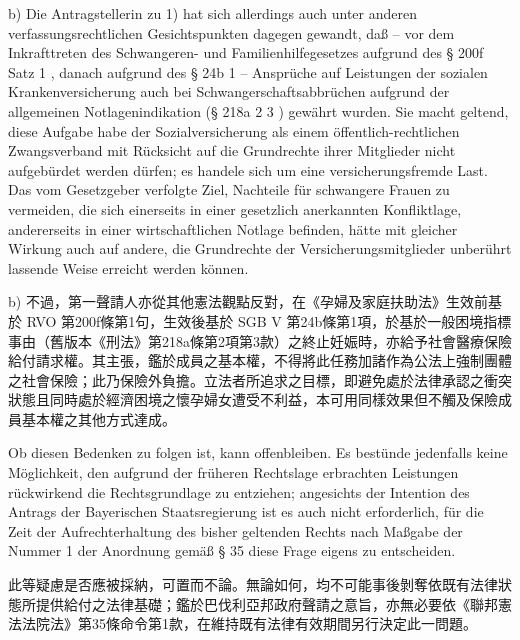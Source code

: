 \documentclass[12pt]{article}
\begin{document}
\begin{sourcepara}[title={原文E.233}]
b) Die Antragstellerin zu 1) hat sich allerdings auch unter anderen verfassungsrechtlichen Gesichtspunkten dagegen gewandt, daß -- vor dem Inkrafttreten des Schwangeren- und Familienhilfegesetzes aufgrund des § 200f Satz 1 \abbrRVO{}, danach aufgrund des § 24b \abbrAbs{} 1 \abbrSGBV{} -- Ansprüche auf Leistungen der sozialen Krankenversicherung auch bei Schwangerschaftsabbrüchen aufgrund der allgemeinen Notlagenindikation (§ 218a \abbrAbs{} 2 \abbrNr{} 3 \abbrStGB{} \abbrAF{}) gewährt wurden. Sie macht geltend, diese Aufgabe habe der Sozialversicherung als einem öffentlich-rechtlichen Zwangsverband mit Rücksicht auf die Grundrechte ihrer Mitglieder nicht aufgebürdet werden dürfen; es handele sich um eine versicherungsfremde Last. Das vom Gesetzgeber verfolgte Ziel, Nachteile für schwangere Frauen zu vermeiden, die sich einerseits in einer gesetzlich anerkannten Konfliktlage, andererseits in einer wirtschaftlichen Notlage befinden, hätte mit gleicher Wirkung auch auf andere, die Grundrechte der Versicherungsmitglieder unberührt lassende Weise erreicht werden können.
\end{sourcepara}
\begin{transpara}
b) 不過，第一聲請人亦從其他憲法觀點反對，在《孕婦及家庭扶助法》生效前基於 RVO 第200f條第1句，生效後基於 SGB V 第24b條第1項，於基於一般困境指標事由（舊版本《刑法》第218a條第2項第3款）之終止妊娠時，亦給予社會醫療保險給付請求權。其主張，鑑於成員之基本權，不得將此任務加諸作為公法上強制團體之社會保險；此乃保險外負擔。立法者所追求之目標，即避免處於法律承認之衝突狀態且同時處於經濟困境之懷孕婦女遭受不利益，本可用同樣效果但不觸及保險成員基本權之其他方式達成。
\end{transpara}

\begin{sourcepara}[title={原文E.234}]
Ob diesen Bedenken zu folgen ist, kann offenbleiben. Es bestünde jedenfalls keine Möglichkeit, den aufgrund der früheren Rechtslage erbrachten Leistungen rückwirkend die Rechtsgrundlage zu entziehen; angesichts der Intention des Antrags der Bayerischen Staatsregierung ist es auch nicht erforderlich, für die Zeit der Aufrechterhaltung des bisher geltenden Rechts nach Maßgabe der Nummer 1 der Anordnung gemäß § 35 \abbrBVerfGG{} diese Frage eigens zu entscheiden.
\end{sourcepara}
\begin{transpara}
此等疑慮是否應被採納，可置而不論。無論如何，均不可能事後剝奪依既有法律狀態所提供給付之法律基礎；鑑於巴伐利亞邦政府聲請之意旨，亦無必要依《聯邦憲法法院法》第35條命令第1款，在維持既有法律有效期間另行決定此一問題。
\end{transpara}
\end{document}

